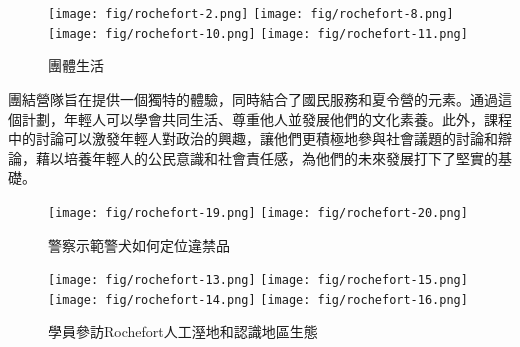 \documentclass[a4paper,14pt]{extarticle}
\theoremstyle{plain}
\theoremstyle{remark}
\numberwithin{equation}{section}
\begin{document}
\begin{itemize}
    \begin{figure}[H]
      \centering
        \texttt{[image: fig/rochefort-2.png]}
        \texttt{[image: fig/rochefort-8.png]}
        \texttt{[image: fig/rochefort-10.png]}
        \texttt{[image: fig/rochefort-11.png]}
       \caption{團體生活}
    \end{figure}

  團結營隊旨在提供一個獨特的體驗，同時結合了國民服務和夏令營的元素。通過這個計劃，年輕人可以學會共同生活、尊重他人並發展他們的文化素養。此外，課程中的討論可以激發年輕人對政治的興趣，讓他們更積極地參與社會議題的討論和辯論，藉以培養年輕人的公民意識和社會責任感，為他們的未來發展打下了堅實的基礎。





    \begin{figure}[H]
      \centering
        \texttt{[image: fig/rochefort-19.png]}
        \texttt{[image: fig/rochefort-20.png]}
      \caption{警察示範警犬如何定位違禁品}
    \end{figure}

    \begin{figure}[H]
      \centering
        \texttt{[image: fig/rochefort-13.png]}
        \texttt{[image: fig/rochefort-15.png]}
        \\ \vspace{0.1cm}
        \texttt{[image: fig/rochefort-14.png]}
        \texttt{[image: fig/rochefort-16.png]}
      \caption{學員參訪Rochefort人工溼地和認識地區生態}
    \end{figure}





\end{itemize}
\end{document}
